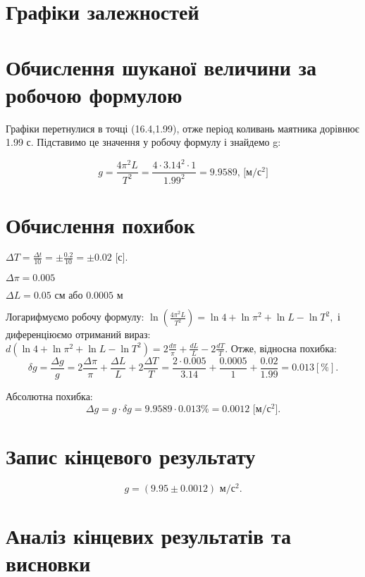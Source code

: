 \documentclass{article}
\begin{document}
{\fontsize{14}{16.2}\selectfont
\begin{center}
\section*{Графіки залежностей}


\section*{Обчислення шуканої величини за робочою формулою}
	Графіки перетнулися в точці (16.4,1.99), отже період
	коливань маятника дорівнює 1.99 с. Підставимо це
	значення у робочу формулу і знайдемо g:

	$$g=\frac{4\pi^2L}{T^2}=\frac{4\cdot3.14^2\cdot1}{1.99^2}=
	9.9589\textrm{, [м/с$^2$]}$$


\section*{Обчислення похибок}

	$\Delta T = \frac{\Delta t}{10} = \pm \frac{0.2}{10} = \pm 0.02 \textrm{ [с].}$
	\medskip

	$\Delta \pi = 0.005$

	$\Delta L =  0.05\textrm{ см або 0.0005 м}$

	\bigskip

	Логарифмуємо робочу формулу:
	$\ln\left(\frac{4\pi^2L}{T^2}\right)=\ln4 + \ln\pi^2
	+ \ln L - \ln T^2,$
	і диференціюємо отриманий вираз:
	$d(\ln4 + \ln\pi^2
	+ \ln L - \ln T^2) =
	2\frac{d\pi}{\pi}+\frac{dL}{L}- 2\frac{dT}{T}.$
	Отже, відносна похибка:
	$$\delta g = \frac{\Delta g}{g} = 2\frac{\Delta\pi}{\pi}+\frac{\Delta L}{L}+
	2\frac{\Delta T}{T} = \frac{2 \cdot 0.005}{3.14}+\frac{0.0005}{1}+
	\frac{0.02}{1.99} = 0.013 [\%].$$

	Абсолютна похибка:
	$$\Delta g = g\cdot\delta g = 9.9589 \cdot 0.013\% = 0.0012\textrm{ [м/с$^2$].}$$

\section*{Запис кінцевого результату}

	$$g=(9.95\pm0.0012) \textrm{ м/с$^2$.}$$

\end{center}
\section*{Аналіз кінцевих результатів та висновки}

}
\end{document}
